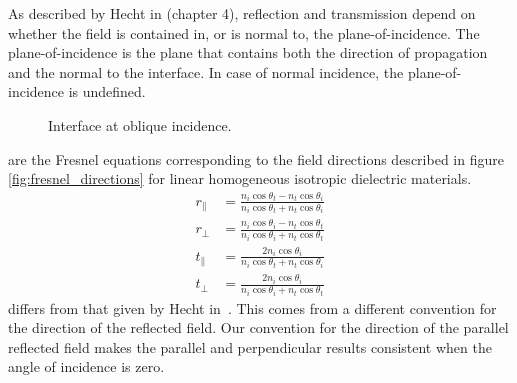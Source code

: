 As described by Hecht in \cite{hecht2002optics} (chapter 4), reflection and transmission depend on whether the field is contained in, or is normal to, the plane-of-incidence.
The plane-of-incidence is the plane that contains both the direction of propagation and the normal to the interface.
In case of normal incidence, the plane-of-incidence is undefined.
\begin{figure}[hbtp]
    \centering
    \caption{\label{fig:net_interface_oblique}Interface at oblique incidence.}
\end{figure}

 are the Fresnel equations corresponding to the field directions described in figure \cref{fig:fresnel_directions} for linear homogeneous isotropic dielectric materials.
\begin{subequations}
    \begin{align}
        r_\parallel & =
        \frac{n_i \cos \theta_t - n_t \cos \theta_i}{n_i \cos \theta_t + n_t \cos \theta_i}
        \label{eq:fresnel_rp}
        \\
        r_\perp & =
        \frac{n_i \cos \theta_i - n_t \cos \theta_t}{n_i \cos \theta_i + n_t \cos \theta_t}
        \label{eq:fresnel_rs}
        \\
        t_\parallel & =
        \frac {2 n_i \cos \theta_i}{n_i \cos \theta_t + n_t \cos \theta_i}
        \label{eq:fresnel_tp}
        \\
        t_\perp & =
        \frac {2 n_i \cos \theta_i}{n_i \cos \theta_i + n_t \cos \theta_t}
        \label{eq:fresnel_ts}
    \end{align}
    \label{eq:fresnel_oblique}
\end{subequations}
 differs from that given by Hecht in~\cite{hecht2002optics}.
This comes from a different convention for the direction of the reflected field.
Our convention for the direction of the parallel reflected field makes the parallel and perpendicular results consistent when the angle of incidence is zero.

%

